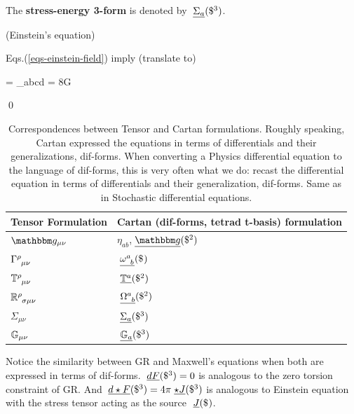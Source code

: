 The {\bf stress-energy 3-form} is denoted by $\pform{\Sigma_a}{3}$.

\begin{claim}(Einstein's equation)

Eqs.(\ref{eqs-einstein-field}) imply
(translate  to)

\beq
{}
=
\eps_{abcd}
\;
\wedge
{}
=
8\pi G\;
\eeq
\beq
{}
\eeq
\end{claim}
\proof
\qed

\begin{table}[]
\begin{tabular}{|l|l|}
\hline
\rowcolor[HTML]{CBCEFB}
Tensor Formulation & \cellcolor[HTML]{FFFC9E}Cartan (dif-forms, tetrad t-basis) formulation \\ \hline
$\metric_{\mu\nu}$ & $\eta_{ab}$,\;$\pform{\metric}{2}$ \\ \hline
$\Gamma\indices{^\rho_{\mu\nu}}$ & $\pform{\omega\indices{^a_b}}{}$ \\ \hline
$\TT\indices{^\rho_{\mu\nu}}$ & $\pform{\TT^a}{2}$ \\ \hline
$\RR\indices{^\rho_{\sigma\mu\nu}}$ & $\pform{\Omega\indices{^a_b}}{2}$ \\ \hline
$\Sigma_{\mu\nu}$ & $\pform{\Sigma_a}{3}$ \\ \hline
${ \mathbb{G}}_{\mu\nu}$ & $\pform{\GG_a}{3}$ \\ \hline
\end{tabular}
\caption{Correspondences between Tensor and Cartan formulations.
Roughly speaking, Cartan expressed
the equations in terms of differentials
and their generalizations, dif-forms.
When converting a Physics
differential equation to the
language of dif-forms,
this is very often what we do: recast the
differential equation in terms of
differentials and their generalization, dif-forms. Same as in Stochastic differential equations.}
\label{tab-tensor-cartan}
\end{table}

Notice the similarity
between GR  and Maxwell's equations
when both are expressed in terms of
dif-forms.
$\pform{dF}{3}=0$
is analogous to the zero
torsion constraint of GR. And
$\pform{d\star F}{3}
= 4\pi
\pform{\star J}{3}$
is analogous to Einstein
equation with the stress tensor
acting as the source $\pform{J}{}$.

